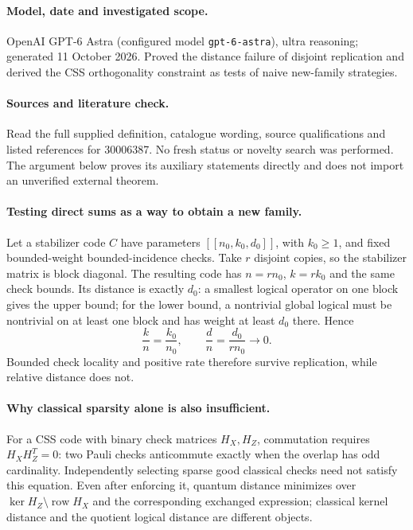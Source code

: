 \documentclass[11pt]{article}
\begin{document}
\paragraph{Model, date and investigated scope.}
OpenAI GPT-6 Astra (configured model \texttt{gpt-6-astra}), ultra reasoning; generated 11 October 2026. Proved the distance failure of disjoint replication and derived the CSS orthogonality constraint as tests of naive new-family strategies.

\paragraph{Sources and literature check.}
Read the full supplied definition, catalogue wording, source qualifications and listed references for 30006387. No fresh status or novelty search was performed. The argument below proves its auxiliary statements directly and does not import an unverified external theorem.

\paragraph{Testing direct sums as a way to obtain a new family.} Let a stabilizer code \(C\) have parameters \([[n_0,k_0,d_0]]\), with \(k_0\geq1\), and fixed bounded-weight bounded-incidence checks. Take \(r\) disjoint copies, so the stabilizer matrix is block diagonal. The resulting code has \(n=rn_0\), \(k=rk_0\) and the same check bounds. Its distance is exactly \(d_0\): a smallest logical operator on one block gives the upper bound; for the lower bound, a nontrivial global logical must be nontrivial on at least one block and has weight at least \(d_0\) there. Hence
\[
 \frac{k}{n}=\frac{k_0}{n_0},\qquad
 \frac{d}{n}=\frac{d_0}{rn_0}\longrightarrow0.
\]
Bounded check locality and positive rate therefore survive replication, while relative distance does not.
\paragraph{Why classical sparsity alone is also insufficient.} For a CSS code with binary check matrices \(H_X,H_Z\), commutation requires \(H_XH_Z^T=0\): two Pauli checks anticommute exactly when the overlap has odd cardinality. Independently selecting sparse good classical checks need not satisfy this equation. Even after enforcing it, quantum distance minimizes over \(\ker H_Z\setminus\operatorname{row}H_X\) and the corresponding exchanged expression; classical kernel distance and the quotient logical distance are different objects.
\end{document}
